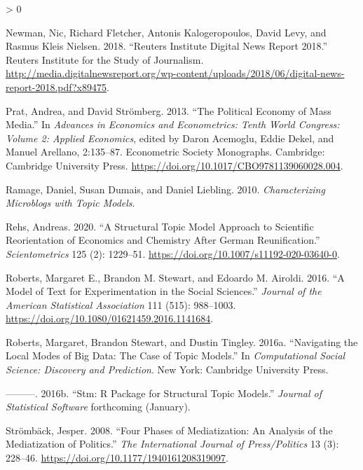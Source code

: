 \documentclass[
  12pt,
]{article}
\newlength{\cslhangindent}
\newenvironment{CSLReferences}[2] %
 {%
  \setlength{\parindent}{0pt}
  \ifodd #1 \everypar{\setlength{\hangindent}{\cslhangindent}}\ignorespaces\fi
  \ifnum #2 > 0
  \setlength{\parskip}{#2\baselineskip}
  \fi
 }%
 {}
\begin{document}
\begin{CSLReferences}{1}{0}
\leavevmode\hypertarget{ref-newman_reuters_2018}{}%
Newman, Nic, Richard Fletcher, Antonis Kalogeropoulos, David Levy, and
Rasmus Kleis Nielsen. 2018. {``Reuters Institute Digital News Report
2018.''} Reuters Institute for the Study of Journalism.
\url{http://media.digitalnewsreport.org/wp-content/uploads/2018/06/digital-news-report-2018.pdf?x89475}.

\leavevmode\hypertarget{ref-acemoglu_political_2013}{}%
Prat, Andrea, and David Strömberg. 2013. {``The Political Economy of
Mass Media.''} In \emph{Advances in Economics and Econometrics: Tenth
World Congress: Volume 2: Applied Economics}, edited by Daron Acemoglu,
Eddie Dekel, and Manuel Arellano, 2:135--87. Econometric Society
Monographs. Cambridge: Cambridge University Press.
\url{https://doi.org/10.1017/CBO9781139060028.004}.

\leavevmode\hypertarget{ref-ramage_characterizing_2010}{}%
Ramage, Daniel, Susan Dumais, and Daniel Liebling. 2010.
\emph{Characterizing Microblogs with Topic Models}.

\leavevmode\hypertarget{ref-rehs_structural_2020}{}%
Rehs, Andreas. 2020. {``A Structural Topic Model Approach to Scientific
Reorientation of Economics and Chemistry After German Reunification.''}
\emph{Scientometrics} 125 (2): 1229--51.
\url{https://doi.org/10.1007/s11192-020-03640-0}.

\leavevmode\hypertarget{ref-roberts_model_2016}{}%
Roberts, Margaret E., Brandon M. Stewart, and Edoardo M. Airoldi. 2016.
{``A Model of Text for Experimentation in the Social Sciences.''}
\emph{Journal of the American Statistical Association} 111 (515):
988--1003. \url{https://doi.org/10.1080/01621459.2016.1141684}.

\leavevmode\hypertarget{ref-roberts_navigating_2016}{}%
Roberts, Margaret, Brandon Stewart, and Dustin Tingley. 2016a.
{``Navigating the Local Modes of Big Data: The Case of Topic Models.''}
In \emph{Computational Social Science: Discovery and Prediction}. New
York: Cambridge University Press.

\leavevmode\hypertarget{ref-roberts_stm:_2016}{}%
---------. 2016b. {``Stm: R Package for Structural Topic Models.''}
\emph{Journal of Statistical Software} forthcoming (January).

\leavevmode\hypertarget{ref-stromback_four_2008}{}%
Strömbäck, Jesper. 2008. {``Four Phases of Mediatization: An Analysis of
the Mediatization of Politics.''} \emph{The International Journal of
Press/Politics} 13 (3): 228--46.
\url{https://doi.org/10.1177/1940161208319097}.


\end{CSLReferences}
\end{document}
